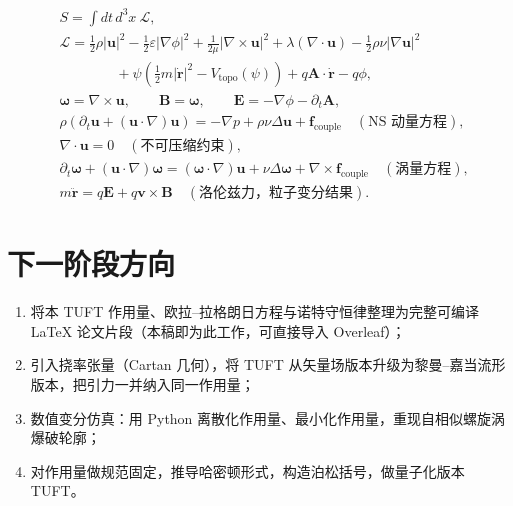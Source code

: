 \documentclass[11pt]{ctexart}
\newcommand{\ve}[1]{\bm{#1}}                         %
\newcommand{\Ltot}{\mathcal{L}}                      %
\newcommand{\Vtopo}{V_{\mathrm{topo}}}               %
\begin{document}
\begin{equation}\label{eq:summary}
\boxed{\begin{aligned}
&S=\int dt\,d^{3}x\ \Ltot,\\
&\Ltot=\frac{1}{2}\rho|\ve{u}|^{2}-\frac{1}{2}\varepsilon|\nabla\phi|^{2}
+\frac{1}{2\mu}|\nabla\times\ve{u}|^{2}
+\lambda(\nabla\cdot\ve{u})-\frac{1}{2}\rho\nu|\nabla\ve{u}|^{2}\\
&\qquad\qquad+\psi\left(\frac{1}{2}m|\dot{\ve{r}}|^{2}-\Vtopo(\psi)\right)
+q\ve{A}\cdot\dot{\ve{r}}-q\phi,\\
&\ve{\omega}=\nabla\times\ve{u},\qquad \ve{B}=\ve{\omega},\qquad
\ve{E}=-\nabla\phi-\partial_{t}\ve{A},\\
&\rho\left(\partial_{t}\ve{u}+(\ve{u}\cdot\nabla)\ve{u}\right)
=-\nabla p+\rho\nu\Delta\ve{u}+\ve{f}_{\mathrm{couple}}
\quad(\text{NS 动量方程}),\\
&\nabla\cdot\ve{u}=0\quad(\text{不可压缩约束}),\\
&\partial_{t}\ve{\omega}+(\ve{u}\cdot\nabla)\ve{\omega}
=(\ve{\omega}\cdot\nabla)\ve{u}+\nu\Delta\ve{\omega}+\nabla\times\ve{f}_{\mathrm{couple}}
\quad(\text{涡量方程}),\\
&m\ddot{\ve{r}}=q\ve{E}+q\ve{v}\times\ve{B}
\quad(\text{洛伦兹力，粒子变分结果}).
\end{aligned}}
\end{equation}

\section{下一阶段方向}

\begin{enumerate}
\item 将本 TUFT 作用量、欧拉--拉格朗日方程与诺特守恒律整理为完整可编译 LaTeX 论文片段（本稿即为此工作，可直接导入 Overleaf）；
\item 引入挠率张量（Cartan 几何），将 TUFT 从矢量场版本升级为黎曼--嘉当流形版本，把引力一并纳入同一作用量；
\item 数值变分仿真：用 Python 离散化作用量、最小化作用量，重现自相似螺旋涡爆破轮廓；
\item 对作用量做规范固定，推导哈密顿形式，构造泊松括号，做量子化版本 TUFT。
\end{enumerate}

\end{document}
